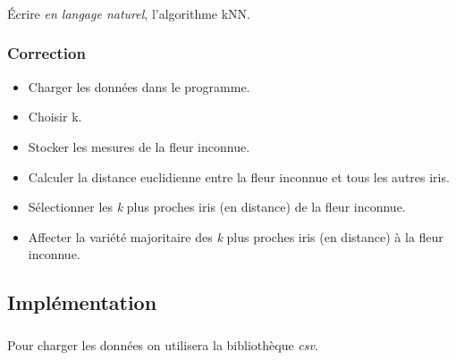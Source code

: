 \documentclass[svgnames,11pt]{beamer}
\begin{document}
\begin{frame}
    \frametitle{}

    \begin{activite}
        Écrire \emph{en langage naturel}, l'algorithme kNN.
        \end{activite}

\end{frame}

\begin{frame}
    \frametitle{Correction}
\begin{itemize}
    \item Charger les données dans le programme.
    \item Choisir k.
    \item Stocker les mesures de la fleur inconnue.
    \item Calculer la distance euclidienne entre la fleur inconnue et tous les autres iris.
    \item Sélectionner les \emph{k} plus proches iris (en distance) de la fleur inconnue.
    \item Affecter la variété majoritaire  des \emph{k} plus proches iris (en distance) à la fleur inconnue.
\end{itemize}
    

\end{frame}
\subsection{Implémentation}
\begin{frame}
    \frametitle{}
Pour charger les données on utilisera la bibliothèque \emph{csv}.

\end{frame}
\end{document}
